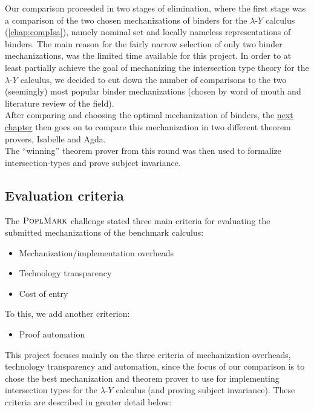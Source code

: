 \documentclass[a4paper, 12pt, twoside]{style/ociamthesis}
\theoremstyle{plain}
\theoremstyle{definition}
\theoremstyle{remark}
\providecommand{\tightlist}{%
  \setlength{\itemsep}{0pt}\setlength{\parskip}{0pt}}
\newcommand{\lamy}{\lambda\text{-}Y}
\newcommand{\poplm}{\textsc{PoplMark}}
\begin{document}
Our comparison proceeded in two stages of elimination, where the first
stage was a comparison of the two chosen mechanizations of binders for
the \(\lamy\) calculus (\cref{chap:compIsa}), namely nominal set and
locally nameless representations of binders. The main reason for the
fairly narrow selection of only two binder mechanizations, was the
limited time available for this project. In order to at least partially
achieve the goal of mechanizing the intersection type theory for the
\(\lamy\) calculus, we decided to cut down the number of comparisons to
the two (seemingly) most popular binder mechanizations (chosen by word
of mouth and literature review of the field).\\
After comparing and choosing the optimal mechanization of binders, the
\hyperref[chap:compAgda]{next chapter} then goes on to compare this
mechanization in two different theorem provers, Isabelle and Agda.\\
The ``winning'' theorem prover from this round was then used to
formalize intersection-types and prove subject invariance.

\subsection{Evaluation criteria}\label{evaluation-criteria}

The \(\poplm\) challenge stated three main criteria for evaluating the
submitted mechanizations of the benchmark calculus:

\begin{itemize}
\tightlist
\item
  Mechanization/implementation overheads
\item
  Technology transparency
\item
  Cost of entry
\end{itemize}

To this, we add another criterion:

\begin{itemize}
\tightlist
\item
  Proof automation
\end{itemize}

This project focuses mainly on the three criteria of mechanization
overheads, technology transparency and automation, since the focus of
our comparison is to chose the best mechanization and theorem prover to
use for implementing intersection types for the \(\lamy\) calculus (and
proving subject invariance). These criteria are described in greater
detail below:
\end{document}
